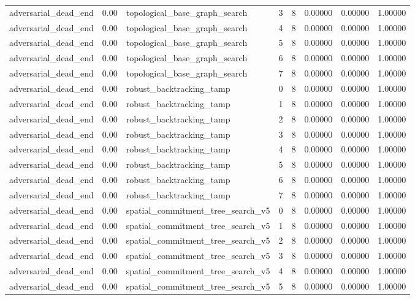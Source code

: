 \documentclass{article}
\begin{document}
\begin{table}[tbp]
{\begin{tabular}{llllllll}
adversarial\_dead\_end & 0.00 & topological\_base\_graph\_search & 3 & 8 & 0.00000 & 0.00000 & 1.00000 \\
adversarial\_dead\_end & 0.00 & topological\_base\_graph\_search & 4 & 8 & 0.00000 & 0.00000 & 1.00000 \\
adversarial\_dead\_end & 0.00 & topological\_base\_graph\_search & 5 & 8 & 0.00000 & 0.00000 & 1.00000 \\
adversarial\_dead\_end & 0.00 & topological\_base\_graph\_search & 6 & 8 & 0.00000 & 0.00000 & 1.00000 \\
adversarial\_dead\_end & 0.00 & topological\_base\_graph\_search & 7 & 8 & 0.00000 & 0.00000 & 1.00000 \\
adversarial\_dead\_end & 0.00 & robust\_backtracking\_tamp & 0 & 8 & 0.00000 & 0.00000 & 1.00000 \\
adversarial\_dead\_end & 0.00 & robust\_backtracking\_tamp & 1 & 8 & 0.00000 & 0.00000 & 1.00000 \\
adversarial\_dead\_end & 0.00 & robust\_backtracking\_tamp & 2 & 8 & 0.00000 & 0.00000 & 1.00000 \\
adversarial\_dead\_end & 0.00 & robust\_backtracking\_tamp & 3 & 8 & 0.00000 & 0.00000 & 1.00000 \\
adversarial\_dead\_end & 0.00 & robust\_backtracking\_tamp & 4 & 8 & 0.00000 & 0.00000 & 1.00000 \\
adversarial\_dead\_end & 0.00 & robust\_backtracking\_tamp & 5 & 8 & 0.00000 & 0.00000 & 1.00000 \\
adversarial\_dead\_end & 0.00 & robust\_backtracking\_tamp & 6 & 8 & 0.00000 & 0.00000 & 1.00000 \\
adversarial\_dead\_end & 0.00 & robust\_backtracking\_tamp & 7 & 8 & 0.00000 & 0.00000 & 1.00000 \\
adversarial\_dead\_end & 0.00 & spatial\_commitment\_tree\_search\_v5 & 0 & 8 & 0.00000 & 0.00000 & 1.00000 \\
adversarial\_dead\_end & 0.00 & spatial\_commitment\_tree\_search\_v5 & 1 & 8 & 0.00000 & 0.00000 & 1.00000 \\
adversarial\_dead\_end & 0.00 & spatial\_commitment\_tree\_search\_v5 & 2 & 8 & 0.00000 & 0.00000 & 1.00000 \\
adversarial\_dead\_end & 0.00 & spatial\_commitment\_tree\_search\_v5 & 3 & 8 & 0.00000 & 0.00000 & 1.00000 \\
adversarial\_dead\_end & 0.00 & spatial\_commitment\_tree\_search\_v5 & 4 & 8 & 0.00000 & 0.00000 & 1.00000 \\
adversarial\_dead\_end & 0.00 & spatial\_commitment\_tree\_search\_v5 & 5 & 8 & 0.00000 & 0.00000 & 1.00000 \\
\bottomrule
\end{tabular}
}
\end{table}
\end{document}

